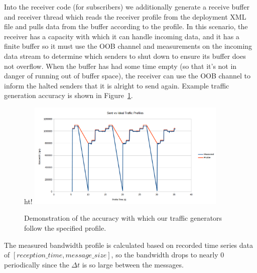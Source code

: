 Into the receiver code (for subscribers) we additionally generate a
receive buffer and receiver thread which reads the receiver profile
from the deployment XML file and pulls data from the buffer according
to the profile.  In this scenario, the receiver has a capacity with
which it can handle incoming data, and it has a finite buffer so it
must use the OOB channel and measurements on the incoming data stream
to determine which senders to shut down to ensure its buffer does not
overflow.  When the buffer has had some time empty (so that it's not
in danger of running out of buffer space), the receiver can use the
OOB channel to inform the halted senders that it is alright to send
again.  Example traffic generation accuracy is shown in
Figure~\ref{fig:generation}. 

\begin{figure}{ht!}
  \centering
  \includegraphics[width=0.85\textwidth]{../doc/src/images/results/traffic_generation.png}
  \caption{Demonstration of the accuracy with which our traffic generators
   follow the specified profile.}
  \label{fig:generation}
\end{figure}

\begin{definition}[Note:]
The measured bandwidth profile is calculated based on
recorded time series data of $[reception\_time,
  message\_size]$, so the bandwidth drops to nearly 0
periodically since the $\Delta t$ is so large between
the messages.
\end{definition}

